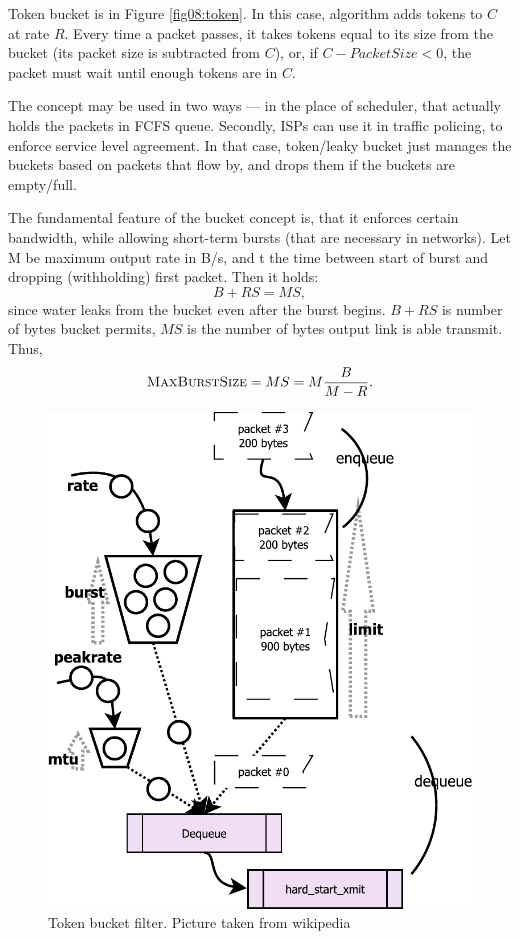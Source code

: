 Token bucket is in Figure \ref{fig08:token}. In this case, algorithm adds tokens to $C$ at rate $R$. Every time a packet passes, it takes tokens equal to its size from the bucket (its packet size is subtracted from $C$), or, if $C - PacketSize < 0$, the packet must wait until enough tokens are in $C$. 

The concept may be used in two ways --- in the place of scheduler, that actually holds the packets in FCFS queue. Secondly, ISPs can use it in traffic policing, to enforce service level agreement. In that case, token/leaky bucket just manages the buckets based on packets that flow by, and drops them if the buckets are empty/full.

The fundamental feature of the bucket concept is, that it enforces certain bandwidth, while allowing short-term bursts (that are necessary in networks). Let M be maximum output rate in B/s, and t the time between start of burst and dropping (withholding) first packet. Then it holds:
\[
	B + RS = MS,
\]
since water leaks from the bucket even after the burst begins. $B + RS$ is number of bytes bucket permits, $MS$ is the number of bytes output link is able transmit. Thus,
\[
	\textsc{MaxBurstSize} = MS = M\frac{B}{M - R}.
\]

\begin{figure}
	\centering
	\includegraphics[width=137mm]{drawings/tbf}
	\caption{Token bucket filter. Picture taken from wikipedia \cite{TBF:picture}}
	
	\label{fig09:tbf}
\end{figure}

